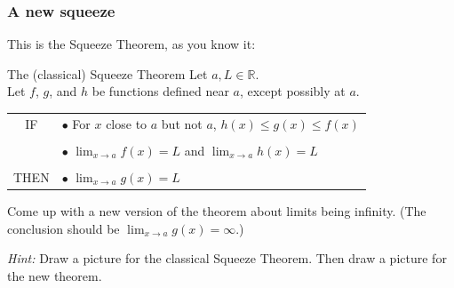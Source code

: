 \documentclass[14pt]{beamer}
\begin{document}
	\begin{frame}[t]
		\frametitle{A new squeeze}
		\fontsize{13}{13}\selectfont This is the Squeeze Theorem, as you know it:

		\begin{block}{The (classical) Squeeze Theorem}
			Let $a, L \in \mathbb{R}$. \\ Let $f$, $g$, and $h$ be functions defined
			near $a$, except possibly at $a$.

			\vspace{.2cm}
			\begin{tabular}{cl}
				IF             & $\bullet$ {For $x$ close to $a$ but not $a$,} \; $\displaystyle h(x) \leq g(x) \leq f(x)$              \\
				\vspace{-0.2cm} \\
				               & $\bullet$ $\displaystyle \lim_{x \to a}f(x) = L$ \quad and \quad$\displaystyle \lim_{x \to a}h(x) = L$ \\
				\vspace{-.1cm}  \\
				THEN           & $\bullet$ $\displaystyle \lim_{x \to a}g(x) = L$
			\end{tabular}
		\end{block}

		Come up with a new version of the theorem about limits being infinity. (The
		conclusion should be $\displaystyle \lim_{x \to a}g(x) = \infty$.)

		\emph{Hint:} Draw a picture for the classical Squeeze Theorem. Then draw a picture
		for the new theorem.
	\end{frame}
\end{document}
